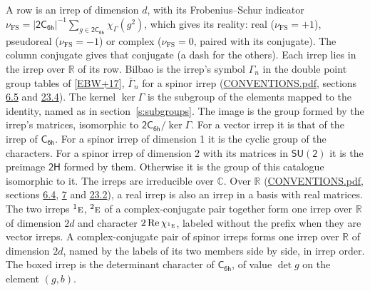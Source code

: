 \documentclass[10pt,a4paper]{article}
\numberwithin{equation}{section}
\newcommand{\grp}[1]{\mathsf{#1}}
\newcommand{\irr}[1]{\text{\normalfont\scshape #1}}
\newcommand{\conjpair}[1]{{}^{#1}}
\newcommand{\irchar}[1]{\chi_{#1}}
\newcommand{\fsind}{\nu_{\mathrm{FS}}}
\begin{document}
\leavevmode\label{n:index.frobenius}\label{n:head.irrep}\label{n:head.reality}A row is an irrep of dimension $d$, with its Frobenius--Schur indicator $\fsind = |\grp{2C_{6h}}|^{-1}\allowbreak\sum_{g\in\grp{2C_{6h}}}\irchar{\Gamma}(g^2)$, which gives its reality: real ($\fsind = +1$), pseudoreal ($\fsind = -1$) or complex ($\fsind = 0$, paired with its conjugate). \label{n:head.conjugate}The column conjugate gives that conjugate (a dash for the others). \label{n:head.over.real}Each irrep lies in the irrep over $\mathbb{R}$ of its row. \label{n:head.bilbao}\label{n:irrep.alias.gamma}Bilbao is the irrep's symbol $\Gamma_n$ in the double point group tables of [\href{../../../REFERENCES.pdf\#ref.EBW+17}{EBW+17}], $\bar{\Gamma}_n$ for a spinor irrep (\href{../../CONVENTIONS.pdf}{CONVENTIONS.pdf}, sections \href{../../../rotation/CONVENTIONS.pdf\#conv.6.5}{6.5} and \href{../../CONVENTIONS.pdf\#conv.23.4}{23.4}). \label{n:head.kernel}The kernel $\ker\Gamma$ is the subgroup of the elements mapped to the identity, named as in section~\ref{s:subgroups}. \label{n:head.image}The image is the group formed by the irrep's matrices, isomorphic to $\grp{2C_{6h}}/\ker\Gamma$. For a vector irrep it is that of the irrep of \href{../../../rotation/data/pdf/C6h.pdf}{$\grp{C_{6h}}$}. For a spinor irrep of dimension 1 it is the cyclic group of the characters. For a spinor irrep of dimension 2 with its matrices in $\grp{SU(2)}$ it is the preimage $\grp{2H}$ formed by them. Otherwise it is the group of this catalogue isomorphic to it. The irreps are irreducible over $\mathbb{C}$. Over $\mathbb{R}$ (\href{../../CONVENTIONS.pdf}{CONVENTIONS.pdf}, sections \href{../../../rotation/CONVENTIONS.pdf\#conv.6.4}{6.4}, \href{../../../rotation/CONVENTIONS.pdf\#conv.7}{7} and \href{../../CONVENTIONS.pdf\#conv.23.2}{23.2}), a real irrep is also an irrep in a basis with real matrices. The two irreps $\conjpair{1}\irr{e}$, $\conjpair{2}\irr{e}$ of a complex-conjugate pair together form one irrep over $\mathbb{R}$ of dimension $2d$ and character $2\operatorname{Re}\irchar{\conjpair{1}\irr{e}}$, labeled without the prefix when they are vector irreps. A complex-conjugate pair of spinor irreps forms one irrep over $\mathbb{R}$ of dimension $2d$, named by the labels of its two members side by side, in irrep order. \label{n:mark.determinant}The boxed irrep is the determinant character of \href{../../../rotation/data/pdf/C6h.pdf}{$\grp{C_{6h}}$}, of value $\det g$ on the element $(g, b)$.
\setlength{\emergencystretch}{2em}\par\setlength{\emergencystretch}{0pt}
\end{document}
